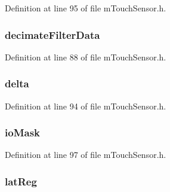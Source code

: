 Definition at line 95 of file m\+Touch\+Sensor.\+h.

\hypertarget{structtag___s_e_n_s_o_r_a9268ba42d5132ace7b1cc6c08f35d68b}{}
\subsubsection[{decimate\+Filter\+Data}]{ decimate\+Filter\+Data}\label{structtag___s_e_n_s_o_r_a9268ba42d5132ace7b1cc6c08f35d68b}


Definition at line 88 of file m\+Touch\+Sensor.\+h.

\hypertarget{structtag___s_e_n_s_o_r_abec2fb1fb9bb67c25a81c02cbcfae4df}{}
\subsubsection[{delta}]{ delta}\label{structtag___s_e_n_s_o_r_abec2fb1fb9bb67c25a81c02cbcfae4df}


Definition at line 94 of file m\+Touch\+Sensor.\+h.

\hypertarget{structtag___s_e_n_s_o_r_ae82fa8fb017b300164751fc9777ae1da}{}
\subsubsection[{io\+Mask}]{ io\+Mask}\label{structtag___s_e_n_s_o_r_ae82fa8fb017b300164751fc9777ae1da}


Definition at line 97 of file m\+Touch\+Sensor.\+h.

\hypertarget{structtag___s_e_n_s_o_r_a9be6f1ad6e8a1a3f9ee8468f5f13d1ef}{}
\subsubsection[{lat\+Reg}]{ lat\+Reg}\label{structtag___s_e_n_s_o_r_a9be6f1ad6e8a1a3f9ee8468f5f13d1ef}


